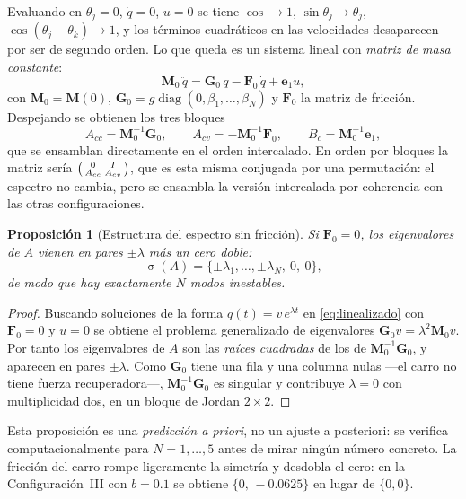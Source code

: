 \documentclass[11pt,letterpaper]{article}
\theoremstyle{definition}
\theoremstyle{plain}
\newtheorem{proposicion}[definicion]{Proposición}
\theoremstyle{remark}
\DeclareMathOperator{\diag}{diag}
\DeclareMathOperator{\spec}{\sigma}
\newcommand{\Mm}{\bm{M}}
\newcommand{\Gm}{\bm{G}}
\newcommand{\Fm}{\bm{F}}
\begin{document}
Evaluando en $\theta_j=0$, $\dot q=0$, $u=0$ se tiene $\cos\to1$,
$\sin\theta_j\to\theta_j$, $\cos(\theta_j-\theta_k)\to1$, y los términos
cuadráticos en las velocidades desaparecen por ser de segundo orden. Lo que
queda es un sistema lineal con \emph{matriz de masa constante}:
\begin{equation}
\Mm_0\,\ddot q=\Gm_0\,q-\Fm_0\,\dot q+\bm{e}_1u,
\label{eq:linealizado}
\end{equation}
con $\Mm_0=\Mm(0)$, $\Gm_0=g\diag(0,\beta_1,\dots,\beta_N)$ y $\Fm_0$ la matriz
de fricción. Despejando se obtienen los tres bloques
\[
A_{cc}=\Mm_0^{-1}\Gm_0,\qquad A_{cv}=-\Mm_0^{-1}\Fm_0,\qquad
B_c=\Mm_0^{-1}\bm{e}_1,
\]
que se ensamblan directamente en el orden intercalado. En orden por bloques la
matriz sería $\begin{psmallmatrix}0&I\\A_{cc}&A_{cv}\end{psmallmatrix}$, que es
esta misma conjugada por una permutación: el espectro no cambia, pero se
ensambla la versión intercalada por coherencia con las otras configuraciones.

\begin{proposicion}[Estructura del espectro sin fricción]
\label{prop:espectro}
Si $\Fm_0=0$, los eigenvalores de $A$ vienen en pares $\pm\lambda$ más un cero
doble:
\[
\spec(A)=\{\pm\lambda_1,\dots,\pm\lambda_N,\ 0,\ 0\},
\]
de modo que hay exactamente $N$ modos inestables.
\end{proposicion}

\begin{proof}
Buscando soluciones de la forma $q(t)=v\,e^{\lambda t}$ en
\cref{eq:linealizado} con $\Fm_0=0$ y $u=0$ se obtiene el problema generalizado
de eigenvalores $\Gm_0 v=\lambda^2\Mm_0 v$. Por tanto los eigenvalores de $A$
son las \emph{raíces cuadradas} de los de $\Mm_0^{-1}\Gm_0$, y aparecen en pares
$\pm\lambda$. Como $\Gm_0$ tiene una fila y una columna nulas ---el carro no
tiene fuerza recuperadora---, $\Mm_0^{-1}\Gm_0$ es singular y contribuye
$\lambda=0$ con multiplicidad dos, en un bloque de Jordan $2\times2$.
\end{proof}

Esta proposición es una \emph{predicción a priori}, no un ajuste a posteriori:
se verifica computacionalmente para $N=1,\dots,5$ antes de mirar ningún número
concreto. La fricción del carro rompe ligeramente la simetría y desdobla el
cero: en la Configuración~III con $b=0.1$ se obtiene $\{0,\,-0.0625\}$ en lugar
de $\{0,0\}$.
\end{document}
